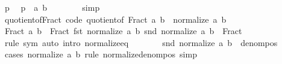 \begin{isabellebody}
\ p\ \isamarkupfalse%
\ {\isachardoublequoteopen}p\ {\isacharequal}{\kern0pt}\ {\isacharparenleft}{\kern0pt}a{\isacharcomma}{\kern0pt}\ b{\isacharparenright}{\kern0pt}{\isachardoublequoteclose}\isanewline
\ \ \ \ \ \ \isamarkupfalse%
\ simp\isanewline
\ \ \isamarkupfalse%
\isanewline
{}\isamarkupfalse%
%
\endisatagproof
{\isafoldproof}%
%
\isadelimproof
\isanewline
%
\endisadelimproof
\isanewline
{}\isamarkupfalse%
\ quotient{\isacharunderscore}{\kern0pt}of{\isacharunderscore}{\kern0pt}Fract\ {\isacharbrackleft}{\kern0pt}code{\isacharbrackright}{\kern0pt}{\isacharcolon}{\kern0pt}\ {\isachardoublequoteopen}quotient{\isacharunderscore}{\kern0pt}of\ {\isacharparenleft}{\kern0pt}Fract\ a\ b{\isacharparenright}{\kern0pt}\ {\isacharequal}{\kern0pt}\ normalize\ {\isacharparenleft}{\kern0pt}a{\isacharcomma}{\kern0pt}\ b{\isacharparenright}{\kern0pt}{\isachardoublequoteclose}\isanewline
%
\isadelimproof
%
\endisadelimproof
%
\isatagproof
{}\isamarkupfalse%
\ {\isacharminus}{\kern0pt}\isanewline
\ \ \isamarkupfalse%
\ {\isachardoublequoteopen}Fract\ a\ b\ {\isacharequal}{\kern0pt}\ Fract\ {\isacharparenleft}{\kern0pt}fst\ {\isacharparenleft}{\kern0pt}normalize\ {\isacharparenleft}{\kern0pt}a{\isacharcomma}{\kern0pt}\ b{\isacharparenright}{\kern0pt}{\isacharparenright}{\kern0pt}{\isacharparenright}{\kern0pt}\ {\isacharparenleft}{\kern0pt}snd\ {\isacharparenleft}{\kern0pt}normalize\ {\isacharparenleft}{\kern0pt}a{\isacharcomma}{\kern0pt}\ b{\isacharparenright}{\kern0pt}{\isacharparenright}{\kern0pt}{\isacharparenright}{\kern0pt}{\isachardoublequoteclose}\ {\isacharparenleft}{\kern0pt}\ {\isacharquery}{\kern0pt}Fract{\isacharparenright}{\kern0pt}\isanewline
\ \ \ \ \isamarkupfalse%
\ {\isacharparenleft}{\kern0pt}rule\ sym{\isacharparenright}{\kern0pt}\ {\isacharparenleft}{\kern0pt}auto\ intro{\isacharcolon}{\kern0pt}\ normalize{\isacharunderscore}{\kern0pt}eq{\isacharparenright}{\kern0pt}\isanewline
\ \ \isamarkupfalse%
\ \isamarkupfalse%
\ {\isachardoublequoteopen}{}\ {\isacharless}{\kern0pt}\ snd\ {\isacharparenleft}{\kern0pt}normalize\ {\isacharparenleft}{\kern0pt}a{\isacharcomma}{\kern0pt}\ b{\isacharparenright}{\kern0pt}{\isacharparenright}{\kern0pt}{\isachardoublequoteclose}\ {\isacharparenleft}{\kern0pt}\ {\isacharquery}{\kern0pt}denom{\isacharunderscore}{\kern0pt}pos{\isacharparenright}{\kern0pt}\isanewline
\ \ \ \ \isamarkupfalse%
\ {\isacharparenleft}{\kern0pt}cases\ {\isachardoublequoteopen}normalize\ {\isacharparenleft}{\kern0pt}a{\isacharcomma}{\kern0pt}\ b{\isacharparenright}{\kern0pt}{\isachardoublequoteclose}{\isacharparenright}{\kern0pt}\ {\isacharparenleft}{\kern0pt}rule\ normalize{\isacharunderscore}{\kern0pt}denom{\isacharunderscore}{\kern0pt}pos{\isacharcomma}{\kern0pt}\ simp{\isacharparenright}{\kern0pt}\isanewline

\end{isabellebody}
